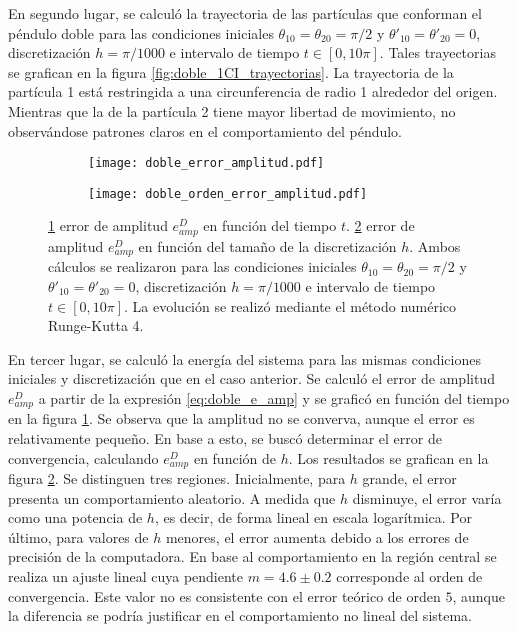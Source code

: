 \documentclass[aps,prb,twocolumn,superscriptaddress,floatfix,longbibliography,10pt]{revtex4-2}
\newcounter{para}
\begin{document}
En segundo lugar, se calculó la trayectoria de las partículas que conforman el péndulo doble para las condiciones iniciales $\theta_{1 0} = \theta_{2 0} = \pi/2$ y $\theta'_{1 0} = \theta'_{2 0} = 0$, discretización $h = \pi/1000$ e intervalo de tiempo $t \in [0, 10 \pi]$. Tales trayectorias se grafican en la figura \ref{fig:doble_1CI_trayectorias}. La trayectoria de la partícula 1 está restringida a una circunferencia de radio 1 alrededor del origen. Mientras que la de la partícula 2 tiene mayor libertad de movimiento, no observándose patrones claros en el comportamiento del péndulo.


\begin{figure}
  \centering
  \begin{subfigure}[b]{0.45\textwidth}
      \centering
      \texttt{[image: doble\_error\_amplitud.pdf]}
      \caption{\label{fig:doble_error_amplitud}}
  \end{subfigure}
  \hfill
  \begin{subfigure}[b]{0.45\textwidth}
      \centering
      \texttt{[image: doble\_orden\_error\_amplitud.pdf]}
      \caption{\label{fig:doble_orden_error_amplitud}}
  \end{subfigure}
     \caption{\ref{fig:doble_error_amplitud} error de amplitud  $e_{amp}^D$ en función del tiempo $t$. \ref{fig:doble_orden_error_amplitud} error de amplitud  $e_{amp}^D$ en función del tamaño de la discretización $h$. Ambos cálculos se realizaron para las condiciones iniciales $\theta_{1 0} = \theta_{2 0} = \pi/2$ y $\theta'_{1 0} = \theta'_{2 0} = 0$, discretización $h = \pi/1000$ e intervalo de tiempo $t \in [0, 10 \pi]$. La evolución se realizó mediante el método numérico Runge-Kutta 4.}
     \label{fig:doble_e_amp}
\end{figure}


En tercer lugar, se calculó la energía del sistema para las mismas condiciones iniciales y discretización que en el caso anterior. Se calculó el error de amplitud $e_{amp}^D$ a partir de la expresión \ref{eq:doble_e_amp} y se graficó en función del tiempo en la figura \ref{fig:doble_error_amplitud}. Se observa que la amplitud no se converva, aunque el error es relativamente pequeño. En base a esto, se buscó determinar el error de convergencia, calculando $e_{amp}^D$ en función de $h$. Los resultados se grafican en la figura \ref{fig:doble_orden_error_amplitud}. Se distinguen tres regiones. Inicialmente, para $h$ grande,
el error presenta un comportamiento aleatorio. A medida que $h$ disminuye, el error varía como una potencia de $h$, es decir, de forma lineal en escala logarítmica. Por
último, para valores de $h$ menores, el error aumenta debido a los errores de precisión de la computadora. En base al comportamiento en la región central se realiza un ajuste lineal cuya pendiente $m = 4.6 \pm 0.2$ corresponde al orden de convergencia. Este valor no es consistente con el error teórico de orden $5$, aunque la diferencia se podría justificar en el comportamiento no lineal del sistema.
\end{document}
